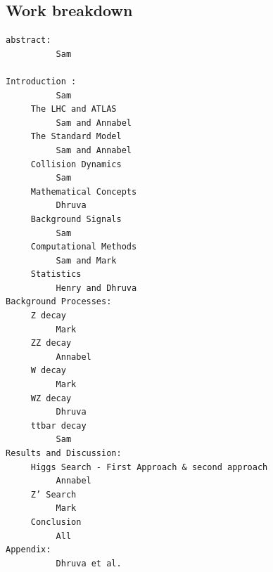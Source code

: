 \documentclass[runningheads,a4paper]{llncs}
\begin{document}
\subsection{Work breakdown}

\fontsize{14}{10}\selectfont
\begin{verbatim}
abstract:
          Sam

Introduction :
          Sam
     The LHC and ATLAS
          Sam and Annabel
     The Standard Model
          Sam and Annabel
     Collision Dynamics
          Sam
     Mathematical Concepts
          Dhruva
     Background Signals
          Sam
     Computational Methods
          Sam and Mark
     Statistics
          Henry and Dhruva
Background Processes:
     Z decay 
          Mark
     ZZ decay
          Annabel
     W decay
          Mark
     WZ decay
          Dhruva
     ttbar decay
          Sam
Results and Discussion:
     Higgs Search - First Approach & second approach
          Annabel
     Z’ Search
          Mark
     Conclusion
          All
Appendix: 
          Dhruva et al.
     
\end{verbatim}
\end{document}
